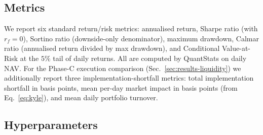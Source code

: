 \documentclass[conference]{IEEEtran}
\begin{document}
\subsection{Metrics}
\label{sec:setup:metrics}
We report six standard return/risk metrics: annualised return,
Sharpe ratio (with $r_f{=}0$), Sortino ratio (downside-only denominator),
maximum drawdown, Calmar ratio (annualised return divided by max
drawdown), and Conditional Value-at-Risk at the $5\%$ tail of daily
returns. All are computed by QuantStats on daily NAV. For the Phase-C
execution comparison (Sec.~\ref{sec:results-liquidity}) we additionally
report three implementation-shortfall metrics: total implementation
shortfall in basis points, mean per-day market impact in basis points
(from Eq.~\ref{eq:kyle}), and mean daily portfolio turnover.

\subsection{Hyperparameters}
\label{sec:setup:hyper}
\end{document}
